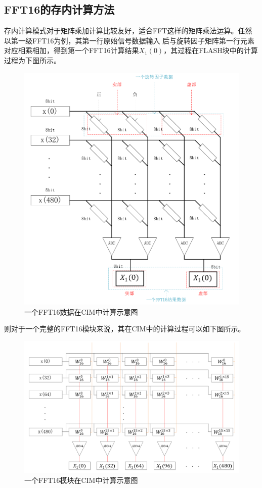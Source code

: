 \documentclass[12pt,a4paper]{article}
\begin{document}
\subsection{FFT16的存内计算方法}
存内计算模式对于矩阵乘加计算比较友好，适合FFT这样的矩阵乘法运算。任然以第一级FFT16为例，其第一行原始信号数据输入
后与旋转因子矩阵第一行元素对应相乘相加，得到第一个FFT16计算结果$X_1(0)$，其过程在FLASH块中的计算过程为下图所示。

\begin{figure}[h]
\centering
\includegraphics[scale=0.5]{figures/figure3}
\caption{一个FFT16数据在CIM中计算示意图}
\end{figure}

\noindent 则对于一个完整的FFT16模块来说，其在CIM中的计算过程可以如下图所示。
\begin{figure}[h]
\centering
\includegraphics[scale=0.5]{figures/figure4}
\caption{一个FFT16模块在CIM中计算示意图}
\end{figure}
\end{document}
